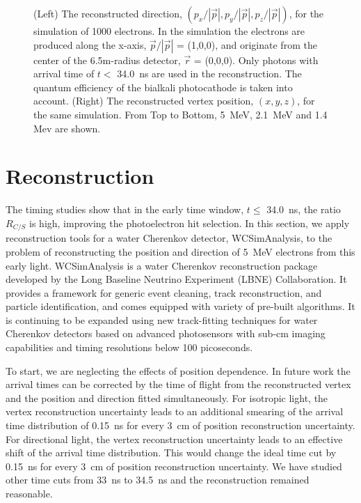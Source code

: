 \documentclass[cits]{JINST}
\begin{document}
\begin{figure}[tbh]
\begin{center}
        \caption[]{\label{fig:reco} (Left) The reconstructed direction,
        $(p_x/|\vec{p}|, p_y/|\vec{p}|,
        p_z/|\vec{p}|)$, for the simulation of 1000 electrons. In the simulation the electrons are produced along the
        x-axis, $\vec{p}/|\vec{p}|$ = (1,0,0), and originate
        from the center of the 6.5m-radius detector, $\vec{r}$ =
        (0,0,0). Only photons with arrival time of $t<$ 34.0~ns are used
        in the reconstruction. The quantum efficiency of the bialkali
        photocathode is taken into account. (Right) The reconstructed
        vertex position, $(x,y,z)$, for the same simulation. From Top to Bottom, 5~MeV, 2.1~MeV and 1.4 Mev are shown.}
\end{center}
\end{figure}

\section{Reconstruction}
\label{reconstruction_sec}

The timing studies show that in the early time window, $t\leq$
34.0~ns, the ratio $R_{C/S}$ is high, improving the photoelectron hit selection. In this section, we apply
reconstruction tools for a water Cherenkov detector, WCSimAnalysis,
to the problem of reconstructing the position and direction of 5~MeV
electrons from this early light. WCSimAnalysis is a water Cherenkov
reconstruction package developed by the Long Baseline Neutrino
Experiment (LBNE) Collaboration\cite{Blake}. It provides a framework
for generic event cleaning, track reconstruction, and particle
identification, and comes equipped with variety of pre-built
algorithms. It is continuing to be expanded using new track-fitting
techniques for water Cherenkov detectors\cite{Sanchez2012525} based on
advanced photosensors with sub-cm imaging capabilities and timing
resolutions below 100 picoseconds.

To start, we are neglecting the effects of position dependence. In future work the arrival times can be corrected by the time of flight from the reconstructed vertex and the position and direction fitted simultaneously. For isotropic light, the vertex reconstruction uncertainty leads to an additional smearing of the arrival time distribution of 0.15~ns for every 3~cm of position reconstruction uncertainty. For directional light, the vertex reconstruction uncertainty leads to an effective shift of the arrival time distribution. This would change the ideal time cut by 0.15~ns  for every 3~cm of position reconstruction uncertainty. We have studied other time cuts from 33~ns to 34.5~ns and the reconstruction remained reasonable. 
\end{document}
